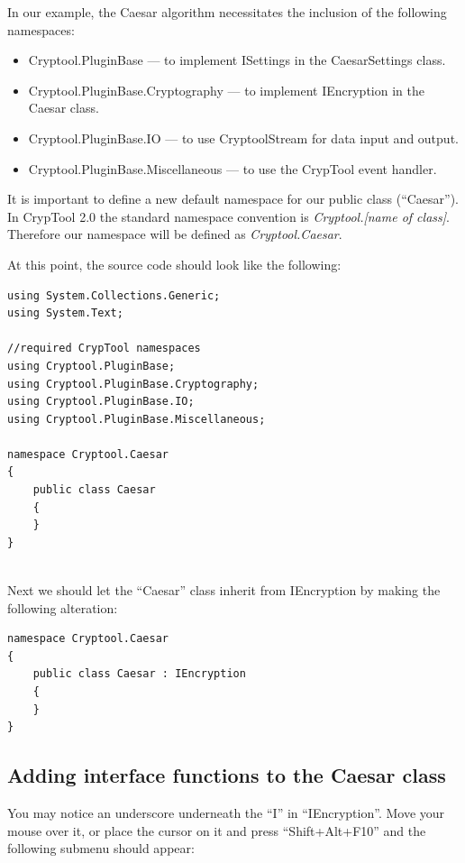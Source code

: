 \noindent In our example, the Caesar algorithm necessitates the inclusion of the following namespaces:

\begin{itemize}
	\item Cryptool.PluginBase --- to implement ISettings in the CaesarSettings class.
	\item Cryptool.PluginBase.Cryptography --- to implement IEncryption in the Caesar class.
	\item Cryptool.PluginBase.IO --- to use CryptoolStream for data input and output.
	\item Cryptool.PluginBase.Miscellaneous --- to use the CrypTool event handler.
\end{itemize}

\noindent It is important to define a new default namespace for our public class (``Caesar''). In CrypTool 2.0  the standard namespace convention is \textit{Cryptool.[name of class]}. Therefore our namespace will be defined as \textit{Cryptool.Caesar}.\clearpage

\noindent At this point, the source code should look like the following:

\begin{lstlisting}
using System.Collections.Generic;
using System.Text;

//required CrypTool namespaces
using Cryptool.PluginBase;
using Cryptool.PluginBase.Cryptography;
using Cryptool.PluginBase.IO;
using Cryptool.PluginBase.Miscellaneous;

namespace Cryptool.Caesar
{
	public class Caesar
	{
	}
}
\end{lstlisting}

\ \\ %
\noindent Next we should let the ``Caesar'' class inherit from IEncryption by making the following alteration:

\begin{lstlisting}
namespace Cryptool.Caesar
{
	public class Caesar : IEncryption
	{
	}
}
\end{lstlisting}

\subsection{Adding interface functions to the Caesar class}
\label{sec:AddingInterfaceFunctionsToTheCaesarClass}

You may notice an underscore underneath the ``I'' in ``IEncryption''. Move your mouse over it, or place the cursor on it and press ``Shift+Alt+F10'' and the following submenu should appear:

